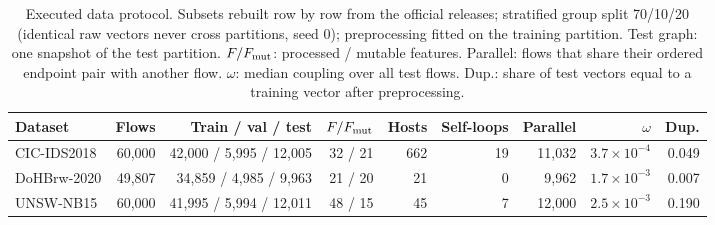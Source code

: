 \begin{table}[t]
\centering\small
\caption{Executed data protocol. Subsets rebuilt row by row from the official releases; stratified group split 70/10/20 (identical raw vectors never cross partitions, seed 0); preprocessing fitted on the training partition. Test graph: one snapshot of the test partition. $F/F_{\rm mut}$: processed / mutable features. Parallel: flows that share their ordered endpoint pair with another flow. $\omega$: median coupling over all test flows. Dup.: share of test vectors equal to a training vector after preprocessing.}
\label{tab:data}
\begin{tabular}{@{}lrrrrrrrr@{}}
\toprule
Dataset & Flows & Train / val / test & $F/F_{\rm mut}$ & Hosts & Self-loops & Parallel & $\omega$ & Dup. \\
\midrule
CIC-IDS2018 & 60,000 & 42,000 / 5,995 / 12,005 & 32 / 21 & 662 & 19 & 11,032 & $3.7\times10^{-4}$ & 0.049 \\
DoHBrw-2020 & 49,807 & 34,859 / 4,985 / 9,963 & 21 / 20 & 21 & 0 & 9,962 & $1.7\times10^{-3}$ & 0.007 \\
UNSW-NB15 & 60,000 & 41,995 / 5,994 / 12,011 & 48 / 15 & 45 & 7 & 12,000 & $2.5\times10^{-3}$ & 0.190 \\
\bottomrule
\end{tabular}
\end{table}
